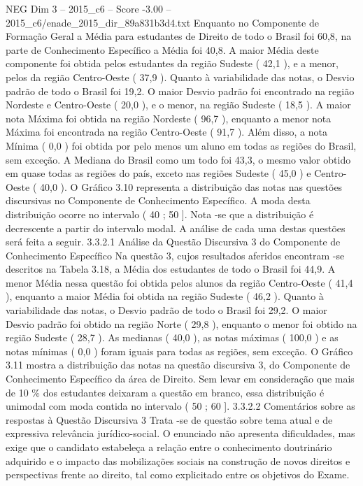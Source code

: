 \begin{textsample}{NEG Dim 3 – 2015\_c6 – Score -3.00 – 2015\_c6/enade\_2015\_dir\_89a831b3d4.txt}
Enquanto no Componente de Formação Geral a Média para estudantes de Direito de todo o Brasil foi 60,8, na parte de Conhecimento Específico a Média foi 40,8.
A maior Média deste componente foi obtida pelos estudantes da região Sudeste ( 42,1 ), e a menor, pelos da região Centro-Oeste ( 37,9 ).
Quanto à variabilidade das notas, o Desvio padrão de todo o Brasil foi 19,2.
O maior Desvio padrão foi encontrado na região Nordeste e Centro-Oeste ( 20,0 ), e o menor, na região Sudeste ( 18,5 ).
A maior nota Máxima foi obtida na região Nordeste ( 96,7 ), enquanto a menor nota Máxima foi encontrada na região Centro-Oeste ( 91,7 ).
Além disso, a nota Mínima ( 0,0 ) foi obtida por pelo menos um aluno em todas as regiões do Brasil, sem exceção.
A Mediana do Brasil como um todo foi 43,3, o mesmo valor obtido em quase todas as regiões do país, exceto nas regiões Sudeste ( 45,0 ) e Centro-Oeste ( 40,0 ).
O Gráfico 3.10 representa a distribuição das notas nas questões discursivas no Componente de Conhecimento Específico.
A moda desta distribuição ocorre no intervalo ( 40 ; 50 ].
Nota -se que a distribuição é decrescente a partir do intervalo modal.
A análise de cada uma destas questões será feita a seguir. 3.3.2.1 Análise da Questão Discursiva 3 do Componente de Conhecimento Específico Na questão 3, cujos resultados aferidos encontram -se descritos na Tabela 3.18, a Média dos estudantes de todo o Brasil foi 44,9.
A menor Média nessa questão foi obtida pelos alunos da região Centro-Oeste ( 41,4 ), enquanto a maior Média foi obtida na região Sudeste ( 46,2 ).
Quanto à variabilidade das notas, o Desvio padrão de todo o Brasil foi 29,2.
O maior Desvio padrão foi obtido na região Norte ( 29,8 ), enquanto o menor foi obtido na região Sudeste ( 28,7 ).
As medianas ( 40,0 ), as notas máximas ( 100,0 ) e as notas mínimas ( 0,0 ) foram iguais para todas as regiões, sem exceção.
O Gráfico 3.11 mostra a distribuição das notas na questão discursiva 3, do Componente de Conhecimento Específico da área de Direito.
Sem levar em consideração que mais de 10 \% dos estudantes deixaram a questão em branco, essa distribuição é unimodal com moda contida no intervalo ( 50 ; 60 ]. 3.3.2.2 Comentários sobre as respostas à Questão Discursiva 3 Trata -se de questão sobre tema atual e de expressiva relevância jurídico-social.
O enunciado não apresenta dificuldades, mas exige que o candidato estabeleça a relação entre o conhecimento doutrinário adquirido e o impacto das mobilizações sociais na construção de novos direitos e perspectivas frente ao direito, tal como explicitado entre os objetivos do Exame.

\end{textsample}
